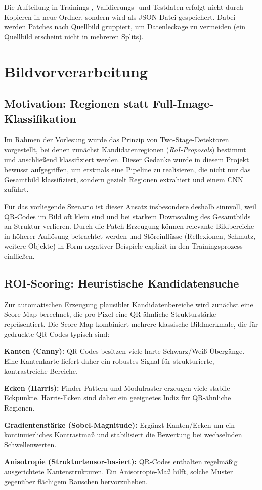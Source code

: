 Die Aufteilung in Trainings-, Validierungs- und Testdaten erfolgt nicht durch Kopieren in neue Ordner, sondern wird als JSON-Datei gespeichert. Dabei werden Patches nach Quellbild gruppiert, um Datenleckage zu vermeiden (ein Quellbild erscheint nicht in mehreren Splits).

\newpage
\section{Bildvorverarbeitung}
\label{sec:bildvorverarbeitung}

\subsection{Motivation: Regionen statt Full-Image-Klassifikation}
\label{sec:roi_motivation}
Im Rahmen der Vorlesung wurde das Prinzip von Two-Stage-Detektoren vorgestellt, bei denen zunächst Kandidatenregionen (\emph{\ac{RoI}-Proposals}) bestimmt und anschließend klassifiziert werden. Dieser Gedanke wurde in diesem Projekt bewusst aufgegriffen, um erstmals eine Pipeline zu realisieren, die nicht nur das Gesamtbild klassifiziert, sondern gezielt Regionen extrahiert und einem \ac{CNN} zuführt. \cite{friedrich2025_cv,girshick2015_fast_rcnn}

Für das vorliegende Szenario ist dieser Ansatz insbesondere deshalb sinnvoll, weil \ac{QR}-Codes im Bild oft klein sind und bei starkem Downscaling des Gesamtbilds an Struktur verlieren. Durch die Patch-Erzeugung können relevante Bildbereiche in höherer Auflösung betrachtet werden und Störeinflüsse (Reflexionen, Schmutz, weitere Objekte) in Form negativer Beispiele explizit in den Trainingsprozess einfließen.

\subsection{ROI-Scoring: Heuristische Kandidatensuche}
\label{sec:roi_scoring}
Zur automatischen Erzeugung plausibler Kandidatenbereiche wird zunächst eine Score-Map berechnet, die pro Pixel eine \ac{QR}-ähnliche Strukturstärke repräsentiert. Die Score-Map kombiniert mehrere klassische Bildmerkmale, die für gedruckte \ac{QR}-Codes typisch sind:

\begin{listNorm}
    \item \textbf{Kanten (Canny):} \ac{QR}-Codes besitzen viele harte Schwarz/Weiß-Übergänge. Eine Kantenkarte liefert daher ein robustes Signal für strukturierte, kontrastreiche Bereiche.
    \item \textbf{Ecken (Harris):} Finder-Pattern und Modulraster erzeugen viele stabile Eckpunkte. Harris-Ecken sind daher ein geeignetes Indiz für \ac{QR}-ähnliche Regionen.
    \item \textbf{Gradientenstärke (Sobel-Magnitude):} Ergänzt Kanten/Ecken um ein kontinuierliches Kontrastmaß und stabilisiert die Bewertung bei wechselnden Schwellenwerten.
    \item \textbf{Anisotropie (Strukturtensor-basiert):} \ac{QR}-Codes enthalten regelmäßig ausgerichtete Kantenstrukturen. Ein Anisotropie-Maß hilft, solche Muster gegenüber flächigem Rauschen hervorzuheben.
\end{listNorm}

